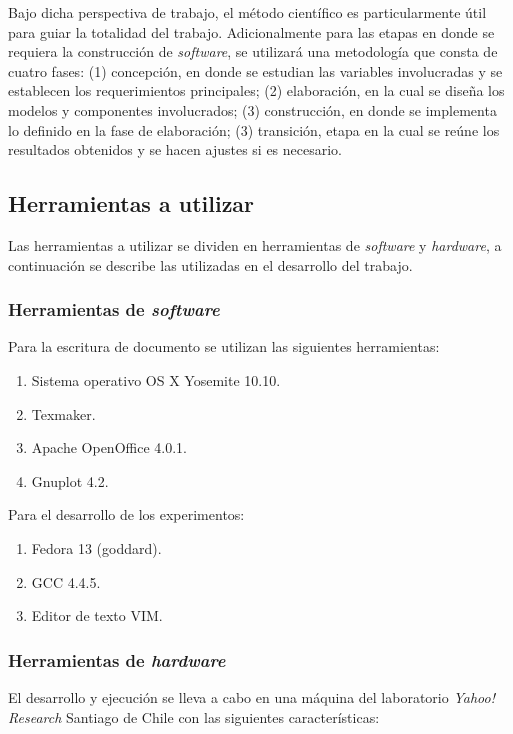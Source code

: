 Bajo dicha perspectiva de trabajo, el método científico es particularmente útil para guiar la totalidad del trabajo.
Adicionalmente para las etapas en donde se requiera la construcción de \textit{software}, se utilizará una metodología que consta de cuatro fases: (1) concepción, en donde se estudian las variables involucradas y se establecen los requerimientos principales; (2) elaboración, en la cual se diseña los modelos y componentes involucrados; (3) construcción, en donde se implementa lo definido en la fase de elaboración; (3) transición, etapa en la cual se reúne los resultados obtenidos y se hacen ajustes si es necesario.  

\subsection{Herramientas a utilizar}
\label{intro:herramientas}
Las herramientas a utilizar se dividen en herramientas de \textit{software} y \textit{hardware}, a continuación se describe las utilizadas en el desarrollo del trabajo.

\subsubsection{Herramientas de \textit{software}}
Para la escritura de documento se utilizan las siguientes herramientas: 

\begin{enumerate}
  \item Sistema operativo OS X Yosemite 10.10.
  \item Texmaker.
  \item Apache OpenOffice 4.0.1.
  \item Gnuplot 4.2.  
\end{enumerate}

Para el desarrollo de los experimentos:

\begin{enumerate}
  \item Fedora 13 (goddard).
  \item GCC 4.4.5.
  \item Editor de texto VIM.
\end{enumerate}

\subsubsection{Herramientas de \textit{hardware}}
El desarrollo y ejecución se lleva a cabo en una máquina del laboratorio \textit{Yahoo!} \textit{Research} Santiago de Chile con las siguientes características: 

